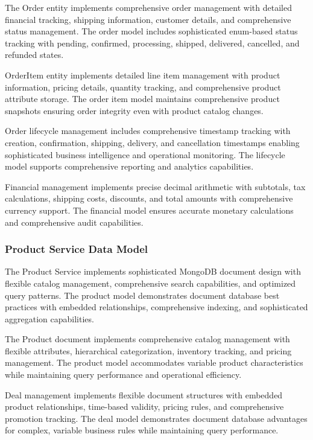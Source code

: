 The Order entity implements comprehensive order management with detailed financial tracking, shipping information, customer details, and comprehensive status management. The order model includes sophisticated enum-based status tracking with pending, confirmed, processing, shipped, delivered, cancelled, and refunded states.

OrderItem entity implements detailed line item management with product information, pricing details, quantity tracking, and comprehensive product attribute storage. The order item model maintains comprehensive product snapshots ensuring order integrity even with product catalog changes.

Order lifecycle management includes comprehensive timestamp tracking with creation, confirmation, shipping, delivery, and cancellation timestamps enabling sophisticated business intelligence and operational monitoring. The lifecycle model supports comprehensive reporting and analytics capabilities.

Financial management implements precise decimal arithmetic with subtotals, tax calculations, shipping costs, discounts, and total amounts with comprehensive currency support. The financial model ensures accurate monetary calculations and comprehensive audit capabilities.

\subsubsection{Product Service Data Model}

The Product Service implements sophisticated MongoDB document design with flexible catalog management, comprehensive search capabilities, and optimized query patterns. The product model demonstrates document database best practices with embedded relationships, comprehensive indexing, and sophisticated aggregation capabilities.

The Product document implements comprehensive catalog management with flexible attributes, hierarchical categorization, inventory tracking, and pricing management. The product model accommodates variable product characteristics while maintaining query performance and operational efficiency.

Deal management implements flexible document structures with embedded product relationships, time-based validity, pricing rules, and comprehensive promotion tracking. The deal model demonstrates document database advantages for complex, variable business rules while maintaining query performance.

